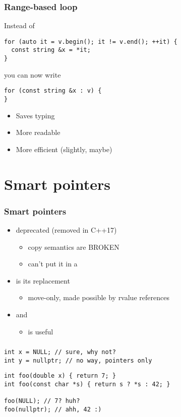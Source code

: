 \documentclass[aspectratio=1610]{beamer}
\begin{document}
\begin{frame}[fragile]
  \frametitle{Range-based  loop}
  Instead of
\begin{verbatim}
for (auto it = v.begin(); it != v.end(); ++it) {
  const string &x = *it;
}
\end{verbatim}
  you can now write
\begin{verbatim}
for (const string &x : v) {
}
\end{verbatim}
  \begin{itemize}
  \item Saves typing
  \item More readable
  \item More efficient (slightly, maybe)
  \end{itemize}
\end{frame}

\section{Smart pointers}

\begin{frame}[fragile]
  \frametitle{Smart pointers}
  \begin{itemize}
  \item {} deprecated (removed in C++17)
    \begin{itemize}
    \item copy semantics are \alert{BROKEN}
    \item can't put it in a 
    \end{itemize}
  \item {} is its replacement
    \begin{itemize}
    \item move-only, made possible by rvalue references
    \end{itemize}
  \item {} and 
    \begin{itemize}
    \item {} is useful
    \end{itemize}
  \end{itemize}
\end{frame}

\begin{frame}
  \frametitle{}
\begin{verbatim}
int x = NULL; // sure, why not?
int y = nullptr; // no way, pointers only
\end{verbatim}
\begin{verbatim}
int foo(double x) { return 7; }
int foo(const char *s) { return s ? *s : 42; }

foo(NULL); // 7? huh?
foo(nullptr); // ahh, 42 :)
\end{verbatim}
\end{frame}
\end{document}
